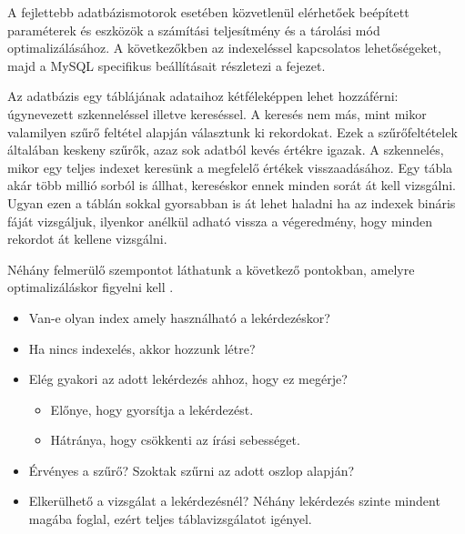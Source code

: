 

A fejlettebb adatbázismotorok esetében közvetlenül elérhetőek beépített paraméterek és eszközök a számítási teljesítmény és a tárolási mód optimalizálásához. A következőkben az indexeléssel kapcsolatos lehetőségeket, majd a MySQL specifikus beállításait részletezi a fejezet.


Az adatbázis egy táblájának adataihoz kétféleképpen lehet hozzáférni: úgynevezett szkenneléssel illetve kereséssel. A keresés nem más, mint mikor valamilyen szűrő feltétel alapján választunk ki rekordokat. Ezek a szűrőfeltételek általában keskeny szűrők, azaz sok adatból kevés értékre igazak. A szkennelés, mikor egy teljes indexet keresünk a megfelelő értékek visszaadásához. Egy tábla akár több millió sorból is állhat, kereséskor ennek minden sorát át kell vizsgálni. Ugyan ezen a táblán sokkal gyorsabban is át lehet haladni ha az indexek bináris fáját vizsgáljuk, ilyenkor anélkül adható vissza a végeredmény, hogy minden rekordot át kellene vizsgálni.

Néhány felmerülő szempontot láthatunk a következő pontokban, amelyre optimalizáláskor figyelni kell \cite{manolopoulos2012advanced}.
\begin{itemize}
\item Van-e olyan index amely használható a lekérdezéskor?
\item Ha nincs indexelés, akkor hozzunk létre?
\item Elég gyakori az adott lekérdezés ahhoz, hogy ez megérje?
\begin{itemize}
\item Előnye, hogy gyorsítja a lekérdezést.
\item Hátránya, hogy csökkenti az írási sebességet.
\end{itemize}
\item Érvényes a szűrő? Szoktak szűrni az adott oszlop alapján?
\item Elkerülhető a vizsgálat a lekérdezésnél? Néhány lekérdezés szinte mindent magába foglal, ezért teljes táblavizsgálatot igényel.
\end{itemize}



